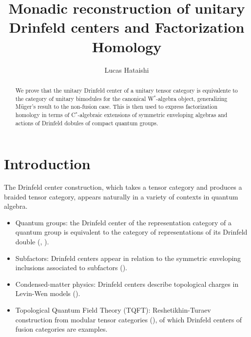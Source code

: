 \documentclass[a4paper,11pt,reqno]{amsart}
\numberwithin{equation}{section}
\theoremstyle{remark}
\theoremstyle{definition}
\newcommand{\C}{\mathbb C}
\newcommand{\cB}{\mathcal B}
\newcommand{\cC}{\mathcal C}
\DeclareMathOperator{\Mod}{Mod}
\begin{document}



\title{Monadic reconstruction of unitary Drinfeld centers and Factorization Homology}

\date{}


\author{Lucas Hataishi}
\address{}




\begin{abstract}
We prove that the unitary Drinfeld center of a unitary tensor category is equivalente to the category of unitary bimodules for the canonical W$^*$-algebra object, generalizing Müger's result to the non-fusion case. This is then used to express factorization homology in terms of C$^*$-algebraic extensions of symmetric enveloping algebras and actions of Drinfeld dobules of compact quantum groups.
\end{abstract}

\maketitle
\tableofcontents


\section{Introduction}

The Drinfeld center construction, which takes a tensor category and produces a braided tensor category, appears naturally in a variety of contexts in quantum algebra. 
\begin{itemize}
	\item Quantum groups: the Drinfeld center of the representation category of a quantum group is equivalent to the category of representations of its Drinfeld double (\cite{MR0934283}, \cite{MR1381692}). 
	\item Subfactors: Drinfeld centers appear in relation to the symmetric enveloping inclusions associated to subfactors (\cites{MR0996454,MR1302385,MR1316301,MR1332979,MR1782145,MR1742858,MR1966524,MR1966525,MR3509018}).
	\item Condensed-matter physics: Drinfeld centers describe topological charges in Levin-Wen models (\cite{PhysRevB.71.045110}).
	\item Topological Quantum Field Theory (TQFT):  Reshetikhin-Turaev construction from modular tensor categories (\cite{MR1091619}), of which Drinfeld centers of fusion categories are examples.
\end{itemize}
\end{document}
